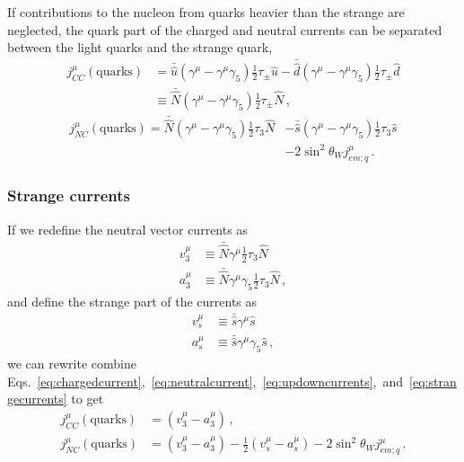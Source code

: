   If contributions to the nucleon from quarks heavier than the strange are
  neglected, the quark part of the charged and neutral currents can be
  separated between the light quarks and the strange quark,
  \begin{equation}\label{eq:chargedcurrent}
    \begin{aligned}
    j^{\mu}_{CC}(\textrm{quarks}) &= \bar{\hat{u}}(\gamma^{\mu} 
                - \gamma^{\mu}\gamma_5)\frac{1}{2}\tau_{\pm}\hat{u}
                - \bar{\hat{d}}(\gamma^{\mu} - \gamma^{\mu}\gamma_5)\frac{1}{2}\tau_{\pm}\hat{d} \\
                 &\equiv \bar{\hat{N}}(\gamma^{\mu} 
                - \gamma^{\mu}\gamma_5)\frac{1}{2}\tau_{\pm}\hat{N} \,,
    \end{aligned}
  \end{equation}
  \begin{equation}\label{eq:neutralcurrent}
    \begin{aligned}
    j^{\mu}_{NC}(\textrm{quarks}) = \bar{\hat{N}}(\gamma^{\mu} 
                - \gamma^{\mu}\gamma_5)\frac{1}{2}\tau_3\hat{N} 
                &- \bar{\hat{s}}(\gamma^{\mu} - \gamma^{\mu}\gamma_5)\frac{1}{2}\tau_3\hat{s}  \\
                  &- 2\sin^2\theta_W j^{\mu}_{em;q} \,.
    \end{aligned}
  \end{equation}

  \subsubsection{Strange currents}
    If we redefine the neutral vector currents as
    \begin{equation}\label{eq:updowncurrents}
      \begin{aligned}
        v^{\mu}_3 &\equiv \bar{\hat{N}} \gamma^{\mu}\frac{1}{2}\tau_3 \hat{N} \\
        a^{\mu}_3 &\equiv \bar{\hat{N}} \gamma^{\mu}\gamma_5\frac{1}{2}\tau_3 \hat{N} \,,
      \end{aligned}
    \end{equation}
    and define the strange part of the currents as
    \begin{equation}\label{eq:strangecurrents}
      \begin{aligned}
        v^{\mu}_s &\equiv \bar{\hat{s}} \gamma^{\mu} \hat{s} \\
        a^{\mu}_s &\equiv \bar{\hat{s}} \gamma^{\mu}\gamma_5 \hat{s} \,,
      \end{aligned}
    \end{equation}
    we can rewrite combine
    Eqs.~\ref{eq:chargedcurrent},~\ref{eq:neutralcurrent},~\ref{eq:updowncurrents},~and~\ref{eq:strangecurrents}
    to get
    \begin{align}
      j^{\mu}_{CC}(\textrm{quarks}) &= (v^{\mu}_3 - a^{\mu}_3) \,, \\
      j^{\mu}_{NC}(\textrm{quarks}) &= (v^{\mu}_3 - a^{\mu}_3) 
        - \frac{1}{2}(v^{\mu}_s - a^{\mu}_s) - 2\sin^2\theta_W j^{\mu}_{em;q} \,.
    \end{align}
    
